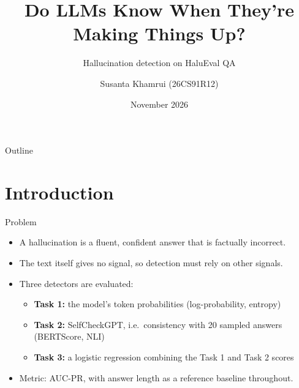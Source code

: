 \documentclass[aspectratio=169,10pt]{beamer}
\title{Do LLMs Know When They're Making Things Up?}
\subtitle{Hallucination detection on HaluEval QA}
\author{Susanta Khamrui (26CS91R12)}
\institute{Project 7, Group 21}
\date{November 2026}
\begin{document}
\begin{frame}
\titlepage
\end{frame}

\begin{frame}{Outline}
\tableofcontents
\end{frame}

\section{Introduction}

\begin{frame}{Problem}
\begin{itemize}
  \item A hallucination is a fluent, confident answer that is factually incorrect.
  \item The text itself gives no signal, so detection must rely on other signals.
  \item Three detectors are evaluated:
  \begin{itemize}
    \item \textbf{Task 1:} the model's token probabilities (log-probability, entropy)
    \item \textbf{Task 2:} SelfCheckGPT, i.e.\ consistency with 20 sampled answers (BERTScore, NLI)
    \item \textbf{Task 3:} a logistic regression combining the Task 1 and Task 2 scores
  \end{itemize}
  \item Metric: AUC-PR, with answer length as a reference baseline throughout.
\end{itemize}
\end{frame}
\end{document}
